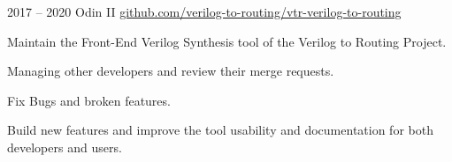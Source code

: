 \entrys
{2017 -- 2020}
{Odin II}
{\href{https://github.com/verilog-to-routing/vtr-verilog-to-routing/graphs/contributors}{github.com/verilog-to-routing/vtr-verilog-to-routing}}{
	Maintain the Front-End Verilog Synthesis tool of the Verilog to Routing Project.
	\begin{tightemize}
		\item Managing other developers and review their merge requests.
		\item Fix Bugs and broken features.
		\item Build new features and improve the tool usability and documentation for both developers and users.
	\end{tightemize}
}
